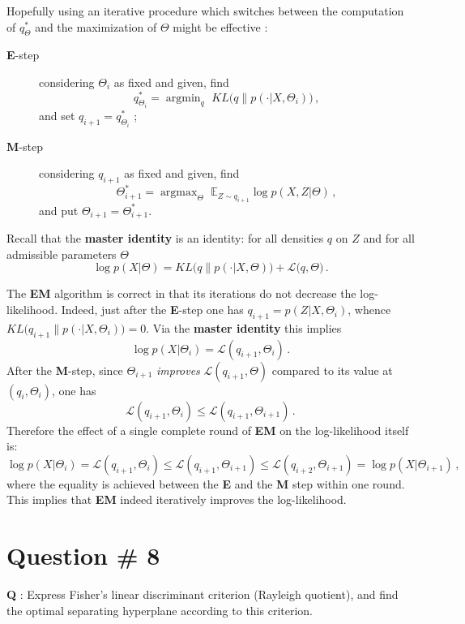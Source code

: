 \documentclass[a4paper]{article}
\newcommand{\argmin}{\mathop{\text{argmin}}}
\newcommand{\argmax}{\mathop{\text{argmax}}}
\begin{document}
Hopefully using an iterative procedure which switches between the computation of $q^*_\Theta$
and the maximization of $\Theta$ might be effective : \begin{description}
	\item[\textbf{E}-step] considering $\Theta_i$ as fixed and given, find
	\[ q^*_{\Theta_i} = \argmin_q \,\, KL\bigl(q\|p(\cdot|X,\Theta_i)\bigr)\,,\]
	and set $q_{i+1} = q^*_{\Theta_i}$ ;
	\item[\textbf{M}-step] considering $q_{i+1}$ as fixed and given, find
	\[ \Theta^*_{i+1} = \argmax_\Theta \,\, \mathbb{E}_{Z\sim q_{i+1}} \log p(X,Z|\Theta)\,,\]
	and put $\Theta_{i+1} = \Theta^*_{i+1}$.
\end{description}

Recall that the \textbf{master identity} is an identity: for all densities $q$ on
$Z$ and for all admissible parameters $\Theta$
\[ \log p(X|\Theta) = KL\bigl(q\|p(\cdot|X,\Theta)\bigr) + \mathcal{L}\bigl(q, \Theta\bigr) \,. \]

The \textbf{EM} algorithm is correct in that its iterations do not decrease the
log-likelihood. Indeed, just after the \textbf{E}-step one has $q_{i+1} = p(Z|X,\Theta_i)$,
whence $KL\bigl(q_{i+1}\|p(\cdot|X,\Theta_i)\bigr) = 0$. Via the \textbf{master identity}
this implies
\[ \log p(X|\Theta_i) = \mathcal{L}(q_{i+1},\Theta_i) \,. \]
After the \textbf{M}-step, since $\Theta_{i+1}$ \emph{improves} $\mathcal{L}(q_{i+1},\Theta)$
compared to its value at $(q_i,\Theta_i)$, one has
\[ \mathcal{L}(q_{i+1},\Theta_i) \leq \mathcal{L}(q_{i+1},\Theta_{i+1}) \,. \]
Therefore the effect of a single complete round of \textbf{EM} on the log-likelihood
itself is:
\[
\log p(X|\Theta_i)
= \mathcal{L}(q_{i+1},\Theta_i)
\leq \mathcal{L}(q_{i+1},\Theta_{i+1})
\leq \mathcal{L}(q_{i+2},\Theta_{i+1})
= \log p(X|\Theta_{i+1}) \,,
\]
where the equality is achieved between the \textbf{E} and the \textbf{M} step within one round.
This implies that \textbf{EM} indeed iteratively improves the log-likelihood.

\clearpage

\section{Question \# 8} %
\label{sec:question_8}
\textbf{\large \textbf{Q}} : Express Fisher's linear discriminant criterion (Rayleigh
quotient), and find the optimal separating hyperplane according to this criterion.
\end{document}
